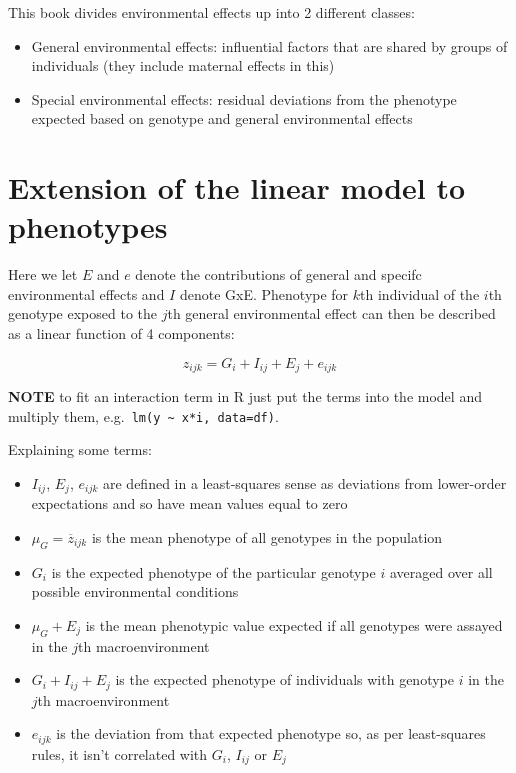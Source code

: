 \documentclass[
]{book}
\providecommand{\tightlist}{%
  \setlength{\itemsep}{0pt}\setlength{\parskip}{0pt}}
\begin{document}
This book divides environmental effects up into 2 different classes:

\begin{itemize}
\tightlist
\item
  General environmental effects: influential factors that are shared by groups of individuals (they include maternal effects in this)
\item
  Special environmental effects: residual deviations from the phenotype expected based on genotype and general environmental effects
\end{itemize}

\hypertarget{extension-of-the-linear-model-to-phenotypes}{%
\section{Extension of the linear model to phenotypes}\label{extension-of-the-linear-model-to-phenotypes}}

Here we let \(E\) and \(e\) denote the contributions of general and specifc environmental effects and \(I\) denote GxE. Phenotype for \(k\)th individual of the \(i\)th genotype exposed to the \(j\)th general environmental effect can then be described as a linear function of 4 components:

\begin{equation}
  z_{ijk} = G_{i} + I_{ij} + E_{j} + e_{ijk}
  \label{eq:phenotype-linear-model}
\end{equation}

\textbf{NOTE} to fit an interaction term in R just put the terms into the model and multiply them, e.g.~\texttt{lm(y\ \textasciitilde{}\ x*i,\ data=df)}.

Explaining some terms:

\begin{itemize}
\tightlist
\item
  \(I_{ij}\), \(E_{j}\), \(e_{ijk}\) are defined in a least-squares sense as deviations from lower-order expectations and so have mean values equal to zero
\item
  \(\mu_{G} = \overline{z}_{ijk}\) is the mean phenotype of all genotypes in the population
\item
  \(G_i\) is the expected phenotype of the particular genotype \(i\) averaged over all possible environmental conditions
\item
  \(\mu_G + E_{j}\) is the mean phenotypic value expected if all genotypes were assayed in the \(j\)th macroenvironment
\item
  \(G_i + I_{ij} + E_{j}\) is the expected phenotype of individuals with genotype \(i\) in the \(j\)th macroenvironment
\item
  \(e_{ijk}\) is the deviation from that expected phenotype so, as per least-squares rules, it isn't correlated with \(G_i\), \(I_{ij}\) or \(E_{j}\)
\end{itemize}
\end{document}
